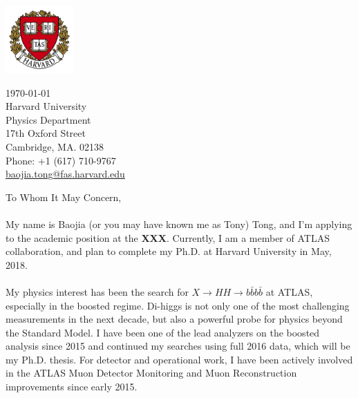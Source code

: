 \documentclass[letterpaper,11pt,oneside]{article}
\begin{document}
\begin{minipage}{.5\textwidth}
  \includegraphics[height=7em]{Harvard}
\end{minipage}
\begin{minipage}{.5\textwidth}
\begin{flushright}
 \today                           \\
 \vspace{1em}                              
 Harvard University            \\
 Physics Department                  \\
 17th Oxford Street                       \\
 Cambridge, MA. 02138   \\
 Phone: +1 (617) 710-9767         \\
\href{mailto:baojia.tong@fas.harvard.edu}{baojia.tong@fas.harvard.edu}  \\ 
\end{flushright}
\end{minipage}

\vspace{2em}
To Whom It May Concern, \\

\onehalfspacing
\paragraph{}
My name is Baojia (or you may have known me as Tony) Tong, and I'm applying to the academic position at the \textbf{XXX}. Currently, I am a member of ATLAS collaboration, and plan to complete my Ph.D. at Harvard University in May, 2018.

\paragraph{}
My physics interest has been the search for $X \to HH \to b\bar{b}b\bar{b}$ at ATLAS, especially in the boosted regime. Di-higgs is not only one of the most challenging measurements in the next decade, but also a powerful probe for physics beyond the Standard Model. I have been one of the lead analyzers on the boosted analysis since 2015 and continued my searches using full 2016 data, which will be my Ph.D. thesis. For detector and operational work, I have been actively involved in the ATLAS Muon Detector Monitoring and Muon Reconstruction improvements since early 2015.
\end{document}

